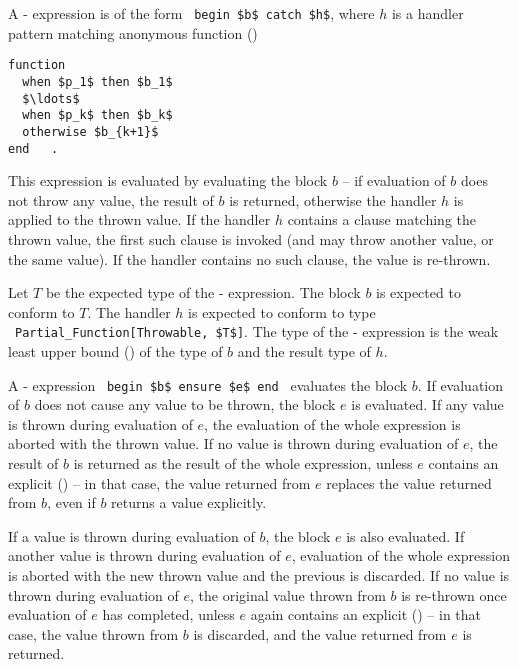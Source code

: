 A - expression is of the form ~\lstinline!begin $b$ catch $h$!, where $h$ is a handler pattern matching anonymous function ()

\begin{minipage}{\linewidth}
\begin{lstlisting}
function 
  when $p_1$ then $b_1$ 
  $\ldots$ 
  when $p_k$ then $b_k$ 
  otherwise $b_{k+1}$
end   .
\end{lstlisting}
\end{minipage}

This expression is evaluated by evaluating the block $b$ -- if evaluation of $b$ does not throw any value, the result of $b$ is returned, otherwise the handler $h$ is applied to the thrown value. If the handler $h$ contains a  clause matching the thrown value, the first such clause is invoked (and may throw another value, or the same value). If the handler contains no such clause, the value is re-thrown. 

Let $T$ be the expected type of the - expression. The block $b$ is expected to conform to $T$. The handler $h$ is expected to conform to type ~\lstinline!Partial_Function[Throwable, $T$]!. The type of the - expression is the weak least upper bound () of the type of $b$ and the result type of $h$. 

A - expression ~\lstinline!begin $b$ ensure $e$ end!~ evaluates the block $b$. If evaluation of $b$ does not cause any value to be thrown, the block $e$ is evaluated. If any value is thrown during evaluation of $e$, the evaluation of the whole expression is aborted with the thrown value. If no value is thrown during evaluation of $e$, the result of $b$ is returned as the result of the whole expression, unless $e$ contains an explicit  () -- in that case, the value returned from $e$ replaces the value returned from $b$, even if $b$ returns a value explicitly. 

If a value is thrown during evaluation of $b$, the  block $e$ is also evaluated. If another value is thrown during evaluation of $e$, evaluation of the whole expression is aborted with the new thrown value and the previous is discarded. If no value is thrown during evaluation of $e$, the original value thrown from $b$ is re-thrown once evaluation of $e$ has completed, unless $e$ again contains an explicit  () -- in that case, the value thrown from $b$ is discarded, and the value returned from $e$ is returned. 

